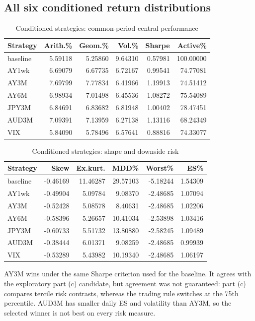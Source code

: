 \documentclass[10pt,letterpaper]{article}
\begin{document}
\subsection{All six conditioned return distributions}
\begin{table}[H]\centering\small\caption{Conditioned strategies: common-period central performance}
\begin{tabular}{lrrrrr}\toprule
Strategy & Arith.\% & Geom.\% & Vol.\% & Sharpe & Active\%\\\midrule
baseline & 5.59118 & 5.25860 & 9.64310 & 0.57981 & 100.00000\\
AY1wk & 6.69079 & 6.67735 & 6.72167 & 0.99541 & 74.77081\\
AY3M & 7.69799 & 7.77834 & 6.41966 & 1.19913 & 74.51412\\
AY6M & 6.98934 & 7.01498 & 6.45536 & 1.08272 & 75.54089\\
JPY3M & 6.84691 & 6.83682 & 6.81948 & 1.00402 & 78.47451\\
AUD3M & 7.09391 & 7.13959 & 6.27138 & 1.13116 & 68.24349\\
VIX & 5.84090 & 5.78496 & 6.57641 & 0.88816 & 74.33077\\
\bottomrule\end{tabular}\end{table}
\begin{table}[H]\centering\small\caption{Conditioned strategies: shape and downside risk}
\begin{tabular}{lrrrrr}\toprule
Strategy & Skew & Ex.kurt. & MDD\% & Worst\% & ES\%\\\midrule
baseline & -0.46169 & 11.46287 & 29.57103 & -5.18244 & 1.54309\\
AY1wk & -0.49904 & 5.09784 & 9.08370 & -2.48685 & 1.07094\\
AY3M & -0.52428 & 5.08578 & 8.40631 & -2.48685 & 1.02206\\
AY6M & -0.58396 & 5.26657 & 10.41034 & -2.53898 & 1.03416\\
JPY3M & -0.60733 & 5.51732 & 13.80880 & -2.58245 & 1.09489\\
AUD3M & -0.38444 & 6.01371 & 9.08259 & -2.48685 & 0.99939\\
VIX & -0.53289 & 5.43982 & 10.19340 & -2.48685 & 1.06197\\
\bottomrule\end{tabular}\end{table}

AY3M wins under the same Sharpe criterion used for the baseline. It agrees with the exploratory
part (c) candidate, but agreement was not guaranteed: part (c) compares tercile risk contrasts,
whereas the trading rule switches at the 75th percentile. AUD3M has smaller daily ES and volatility
than AY3M, so the selected winner is not best on every risk measure.
\end{document}
